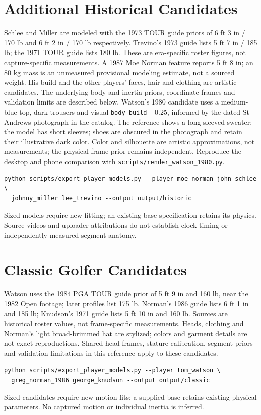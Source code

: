 \documentclass{article}
\begin{document}
\section{Additional Historical Candidates}
Schlee and Miller are modeled with the 1973 TOUR guide priors of 6 ft 3 in /
170 lb and 6 ft 2 in / 170 lb respectively. Trevino's 1973 guide lists 5 ft
7 in / 185 lb; the 1971 TOUR guide lists 180 lb. These are era-specific
roster figures, not capture-specific measurements. A 1987 Moe Norman feature
reports 5 ft 8 in; an 80 kg mass is an unmeasured provisional modeling estimate,
not a sourced weight. His build and the other players' faces, hair and clothing
are artistic candidates. The underlying body and inertia priors, coordinate
frames and validation limits are described below.
Watson's 1980 candidate uses a medium-blue top, dark trousers
and visual \texttt{body\_build} $-0.25$, informed by the dated St Andrews
photograph in the catalog. The reference shows a long-sleeved sweater; the
model has short sleeves; shoes are obscured in the photograph and retain their
illustrative dark color. Color and silhouette are artistic approximations,
not measurements; the physical frame prior remains independent. Reproduce the
desktop and phone comparison with \texttt{scripts/render\_watson\_1980.py}.
\begin{verbatim}
python scripts/export_player_models.py --player moe_norman john_schlee \
  johnny_miller lee_trevino --output output/historic
\end{verbatim}
Sized models require new fitting; an existing base specification retains its
physics. Source videos and uploader attributions do not establish clock timing
or independently measured segment anatomy.
\section{Classic Golfer Candidates}
Watson uses the 1984 PGA TOUR guide prior of 5 ft 9 in and 160 lb, near the
1982 Open footage; later profiles list 175 lb. Norman's 1986 guide lists 6 ft
1 in and 185 lb; Knudson's 1971 guide lists 5 ft 10 in and 160 lb. Sources
are historical roster values, not frame-specific measurements. Heads, clothing
and Norman's light broad-brimmed hat are stylized; colors and garment details
are not exact reproductions. Shared head frames, stature calibration, segment
priors and validation limitations in this reference apply to these candidates.
\begin{verbatim}
python scripts/export_player_models.py --player tom_watson \
  greg_norman_1986 george_knudson --output output/classic
\end{verbatim}
Sized candidates require new motion fits; a supplied base retains existing
physical parameters. No captured motion or individual inertia is inferred.
\end{document}
